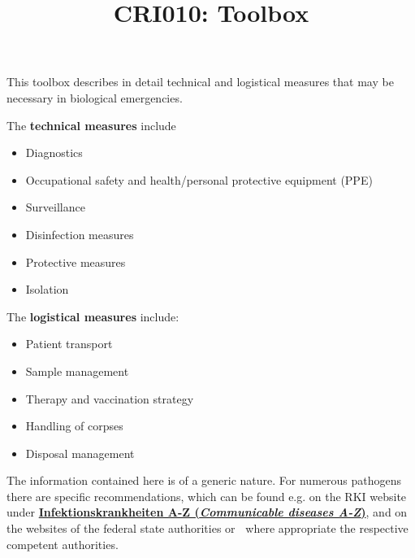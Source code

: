 \documentclass{article}
\begin{document}
\title{CRI010: Toolbox}

\maketitle


This toolbox describes in detail technical and logistical measures that may be necessary in biological emergencies.


The \textbf{technical measures} include

\begin{itemize}
\item Diagnostics


\item Occupational safety and health/personal protective equipment (PPE)


\item Surveillance


\item Disinfection measures


\item Protective measures


\item Isolation


\end{itemize}




The \textbf{logistical measures} include:

\begin{itemize}
\item Patient transport


\item Sample management


\item Therapy and vaccination strategy


\item Handling of corpses


\item Disposal management


\end{itemize}

The information contained here is of a generic nature. For numerous pathogens there are specific recommendations, which can be found e.g. on the RKI website under\textbf{ }\textbf{\href{https://www.rki.de/DE/Content/InfAZ/InfAZ_marginal_node.html}{Infektionskrankheiten A-Z (}}\emph{\textbf{\href{https://www.rki.de/DE/Content/InfAZ/InfAZ_marginal_node.html}{Communicable diseases A-Z}}}\textbf{\href{https://www.rki.de/DE/Content/InfAZ/InfAZ_marginal_node.html}{)}},\textbf{ }and on the websites of the federal state authorities or \textbf{ }where appropriate the respective competent authorities.
\end{document}
